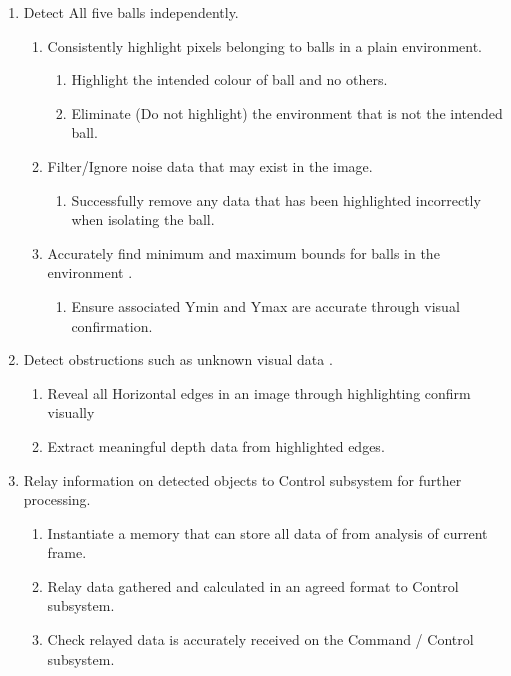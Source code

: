 \documentclass[10pt,twoside]{article}
\begin{document}
\begin{enumerate}
\itemsep0em
  \item Detect All five balls independently. 
        \begin{enumerate}
            \itemsep-0.2em
            \item Consistently highlight pixels belonging to balls in a plain environment.
                \begin{enumerate}
                    \itemsep-0.2em
                    \item Highlight the intended colour of ball and no others.
                    \item Eliminate (Do not highlight) the environment that is not the intended ball.
                \end{enumerate}
            \item Filter/Ignore noise data that may exist in the image.
                \begin{enumerate}
                    \itemsep-0.2em
                    \item Successfully remove any data that has been highlighted incorrectly when isolating the ball. 
                \end{enumerate}
            \item Accurately find minimum and maximum bounds for balls in the environment .
                \begin{enumerate}
                    \itemsep-0.2em
                    \item Ensure associated Ymin and Ymax are accurate through visual confirmation. 
                \end{enumerate}
        \end{enumerate}
  \item Detect obstructions such as unknown visual data .
        \begin{enumerate}
                    \itemsep-0.2em
                    \item Reveal all Horizontal edges in an image through highlighting confirm visually
                    \item Extract meaningful depth data from highlighted edges.
        \end{enumerate}
  \item Relay information on detected objects to Control subsystem for further processing.
        \begin{enumerate}
            \itemsep-0.2em
            \item Instantiate a memory that can store all data of from analysis of current frame. 
            \item Relay data gathered and calculated in an agreed format to Control subsystem.
            \item Check relayed data is accurately received on the Command / Control subsystem. 
        \end{enumerate}
\end{enumerate}
\end{document}
